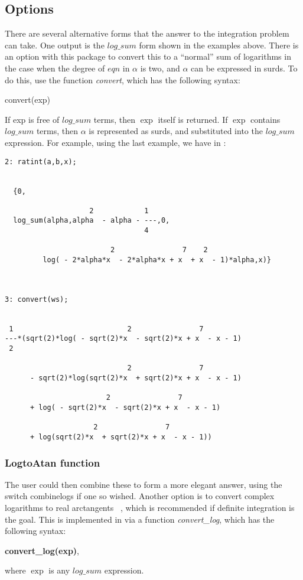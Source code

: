 \subsection{Options}
There are several alternative forms that the answer to the integration problem can take. One output is the $log\_sum$ form shown in the examples above. There is an option with this package to convert this to a ``normal'' sum of logarithms in the case when the degree of $eqn$ in $\alpha$ is two, and $\alpha$ can be expressed in surds. To do this, use the function \emph{convert}, which has the following syntax:
\begin{center}  convert(exp) \end{center}
If exp is free of $log\_sum$ terms, then $\exp$ itself is returned. If $\exp$ contains $log\_sum$ terms, then $\alpha$ is represented as surds, and substituted into the $log\_sum$ expression. For example, using the last example, we have in \REDUCE:
\begin{verbatim}
2: ratint(a,b,x);


  {0,

                    2            1
  log_sum(alpha,alpha  - alpha - ---,0,
                                 4

                         2                7    2
         log( - 2*alpha*x  - 2*alpha*x + x  + x  - 1)*alpha,x)}



3: convert(ws);


 1                           2                7
---*(sqrt(2)*log( - sqrt(2)*x  - sqrt(2)*x + x  - x - 1)
 2

                             2                7
      - sqrt(2)*log(sqrt(2)*x  + sqrt(2)*x + x  - x - 1)

                        2                7
      + log( - sqrt(2)*x  - sqrt(2)*x + x  - x - 1)

                     2                7
      + log(sqrt(2)*x  + sqrt(2)*x + x  - x - 1))
\end{verbatim}

\subsubsection{LogtoAtan function}
The user could then combine these to form a more elegant answer, using the switch combinelogs if one so wished. Another option is to convert complex logarithms to real arctangents ~\cite{Bronstein:97}, which is recommended if definite integration is the goal. This is implemented in \REDUCE via a function \emph{convert\_log}, which has the following syntax:
\begin{center} \textbf{convert\_log(exp)}, \end{center}
where $\exp$ is any $log\_sum$ expression.

